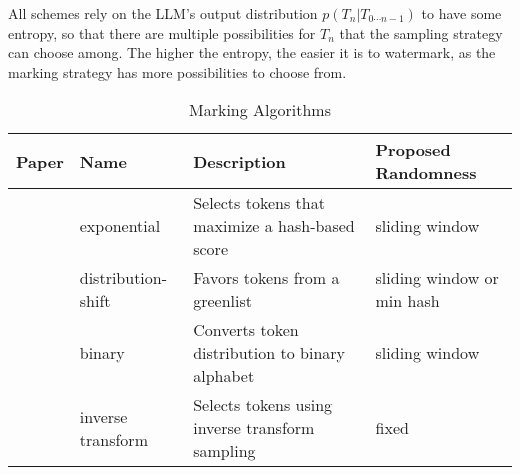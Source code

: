 
All schemes rely on the LLM's output distribution $p(T_n | T_{0 \cdots n-1})$ to have some entropy, so that there are multiple possibilities for $T_n$ that the sampling strategy can choose among.
The higher the entropy, the easier it is to watermark, as the marking strategy has more possibilities to choose from.


\begin{table*}[h]
    \centering
    \caption{Marking Algorithms}
    
    \label{tab:marking-algorithms}
    \begin{tabular}{|l|l|l|l|}
        \hline
        \textbf{Paper} & \textbf{Name} & \textbf{Description} & \textbf{Proposed Randomness}\\
        \hline
        \hline
        \textbf{\citet{aaronson_watermarking_2022}} & exponential & Selects tokens that maximize a hash-based score & sliding window \\
        \hline
        \textbf{\citet{kirchenbauer_watermark_2023}} & distribution-shift & Favors tokens from a greenlist & sliding window or min hash \\
        \hline
        \textbf{\citet{christ_undetectable_2023}} & binary & Converts token distribution to binary alphabet & sliding window \\
        \hline
        \textbf{\citet{kuditipudi_robust_2023}} & inverse transform & Selects tokens using inverse transform sampling & fixed \\
        \hline
    \end{tabular}
\end{table*}
